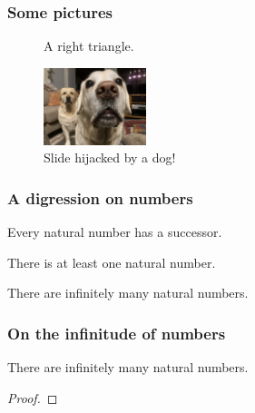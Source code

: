 \documentclass{beamer}
\begin{document}
\begin{frame}
\frametitle{Some pictures}

\begin{figure}
\caption{A right triangle.}
\end{figure}

\begin{figure}
\includegraphics[width=3cm]{../pictures/TheDogs.jpg}
\caption{Slide hijacked by a dog!}
\end{figure}

\end{frame}


\begin{frame}
\frametitle{A digression on numbers}

\begin{theorem}
Every natural number has a successor.
\end{theorem}

\pause

\begin{theorem}
There is at least one natural number.
\end{theorem}

\pause

\begin{corollary}
There are infinitely many natural numbers.
\end{corollary}

\end{frame}


\begin{frame}
\frametitle{On the infinitude of numbers}

\begin{corollary}
There are infinitely many natural numbers.
\end{corollary}
\begin{proof}
\end{proof}

\end{frame}
\end{document}
